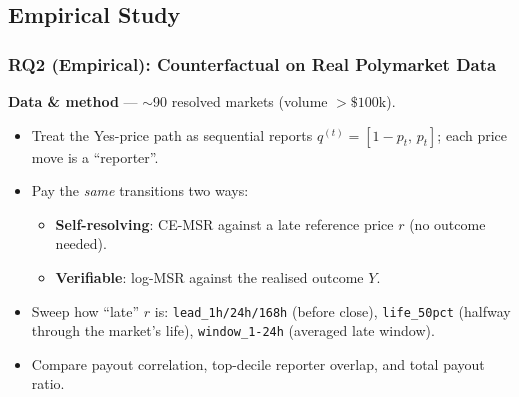 \documentclass[
	11pt, %
]{beamer}
\begin{document}

\subsection{Empirical Study}

\begin{frame}
	\frametitle{RQ2 (Empirical): Counterfactual on Real Polymarket Data}

	\textbf{Data \& method} --- $\sim$90 resolved markets (volume $> \$100$k).
	\begin{itemize}
		\item Treat the Yes-price path as sequential reports $q^{(t)}=[1-p_t,\,p_t]$; each price move is a ``reporter''.
		\item Pay the \emph{same} transitions two ways:
		\begin{itemize}
			\item \textbf{Self-resolving}: CE-MSR against a late reference price $r$ (no outcome needed).
			\item \textbf{Verifiable}: log-MSR against the realised outcome $Y$.
		\end{itemize}
		\item Sweep how ``late'' $r$ is: \texttt{lead\_1h/24h/168h} (before close), \texttt{life\_50pct} (halfway through the market's life), \texttt{window\_1-24h} (averaged late window).
		\item Compare payout correlation, top-decile reporter overlap, and total payout ratio.
	\end{itemize}
\end{frame}

\end{document}
